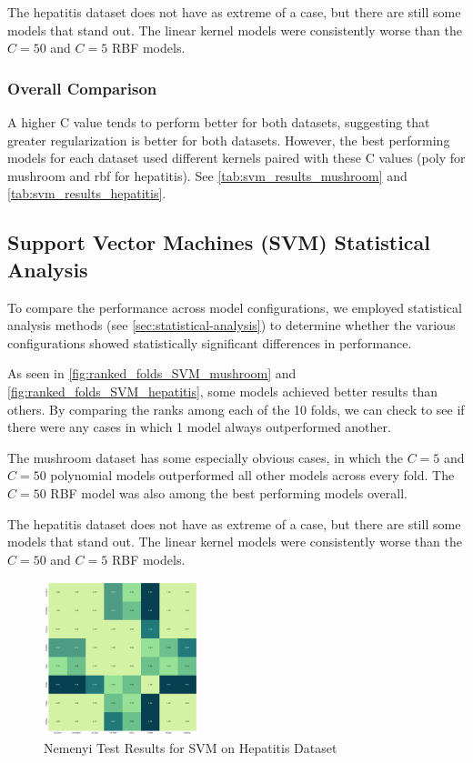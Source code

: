 The hepatitis dataset does not have as extreme of a case, but there are still some models that stand out.
The linear kernel models were consistently worse than the $C=50$ and $C=5$ RBF models.

\subsubsection*{Overall Comparison}
A higher C value tends to perform better for both datasets, suggesting that greater regularization is better for both datasets.
However, the best performing models for each dataset used different kernels paired with these C values
(poly for mushroom and rbf for hepatitis). See \autoref{tab:svm_results_mushroom} and \autoref{tab:svm_results_hepatitis}.

\subsection*{Support Vector Machines (SVM) Statistical Analysis}
To compare the performance across model configurations, we employed statistical analysis methods
(see \autoref{sec:statistical-analysis}) to determine whether the various configurations showed
statistically significant differences in performance.

As seen in \autoref{fig:ranked_folds_SVM_mushroom} and \autoref{fig:ranked_folds_SVM_hepatitis},
some models achieved better results than others. By comparing the ranks among each of the 10 folds,
we can check to see if there were any cases in which 1 model always outperformed another.

The mushroom dataset has some especially obvious cases, in which the $C=5$ and $C=50$ polynomial models
outperformed all other models across every fold. The $C=50$ RBF model was also among the best performing models overall.

The hepatitis dataset does not have as extreme of a case, but there are still some models that stand out.
The linear kernel models were consistently worse than the $C=50$ and $C=5$ RBF models.

\begin{figure}
    \centering
    \includegraphics[width=0.4\textwidth]{figures/nemenyi_test_results_SVM_hepatitis.png}
    \caption{Nemenyi Test Results for SVM on Hepatitis Dataset}
    \label{fig:nemenyi_test_results_SVM_hepatitis}
\end{figure}

